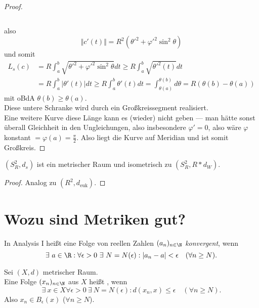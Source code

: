 \begin{lemma}
\begin{proof}
\begin{small}
\begin{equation*}
      \end{equation*}
    \end{small}
    also
    \begin{equation*}
      \Vert c'(t) \Vert = R^2({\theta'}^2 + {\varphi'}^2\sin^2\theta)
    \end{equation*}
    und somit
    \begin{align*}
      L_s(c) &= R\int_a^b\sqrt{{\theta'}^2+{\varphi'}^2\sin^2\theta}dt \geq R\int_a^b\sqrt{{\theta'}^2(t)}dt \\
      &= R\int_a^b \vert \theta'(t) \vert dt \geq R\int_a^b \theta'(t)dt = \int_{\theta(a)}^{\theta(b)}d\theta = R(\theta(b)-\theta(a))
    \end{align*}
    mit oBdA $ \theta(b) \geq \theta(a) $. \\
    Diese untere Schranke wird durch ein Großkreissegment realisiert. \\
    Eine weitere Kurve diese Länge kann es (wieder) nicht geben --- man hätte sonst überall Gleichheit in den Ungleichungen, also insbesondere $ \varphi' = 0 $, also wäre $ \varphi $ konstant $ = \varphi(a) = \frac{\pi}{2} $. Also liegt die Kurve auf Meridian und ist somit Großkreis.
  \end{proof}
\end{lemma}

\begin{theorem}
  $ (S^2_R, d_s) $ ist ein metrischer Raum und isometrisch zu $ (S^2_R, R*d_W) $.
  \begin{proof}
    Analog zu $ (R^2, d_\text{euk}) $.
  \end{proof}
\end{theorem}

\section{Wozu sind Metriken gut?}

\begin{remark}
  In Analysis I heißt eine Folge von reellen Zahlen $ (a_n)_{n \in \N} $ \emph{konvergent}, wenn
  \begin{equation*}
    \exists \ a \in \R : \forall \epsilon > 0 \ \exists \ N = N(\epsilon) : \vert a_n - a \vert < \epsilon \quad (\forall n \geq N)\text{.}
  \end{equation*}
\end{remark}

\begin{remark}
  Sei $ (X, d) $ metrischer Raum. \\
  Eine Folge $ (x_n)_{n \in \N} $ aus $ X $ heißt , wenn
  \begin{equation*}
    \exists \ x \in X \forall \epsilon > 0 \ \exists \ N = N(\epsilon) : d(x_n, x) \leq \epsilon \quad (\forall n \geq N)\text{.}
  \end{equation*}
  Also $ x_n \in B_\epsilon(x) $ ($ \forall n \geq N $).
\end{remark}

